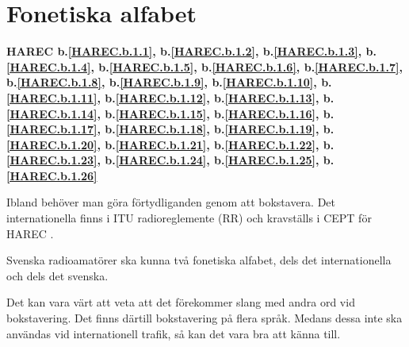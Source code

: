 \section{Fonetiska alfabet}
\textbf{
HAREC b.\ref{HAREC.b.1.1}\label{myHAREC.b.1.1},
 b.\ref{HAREC.b.1.2}\label{myHAREC.b.1.2},
 b.\ref{HAREC.b.1.3}\label{myHAREC.b.1.3},
 b.\ref{HAREC.b.1.4}\label{myHAREC.b.1.4},
 b.\ref{HAREC.b.1.5}\label{myHAREC.b.1.5},
 b.\ref{HAREC.b.1.6}\label{myHAREC.b.1.6},
 b.\ref{HAREC.b.1.7}\label{myHAREC.b.1.7},
 b.\ref{HAREC.b.1.8}\label{myHAREC.b.1.8},
 b.\ref{HAREC.b.1.9}\label{myHAREC.b.1.9},
 b.\ref{HAREC.b.1.10}\label{myHAREC.b.1.10},
 b.\ref{HAREC.b.1.11}\label{myHAREC.b.1.11},
 b.\ref{HAREC.b.1.12}\label{myHAREC.b.1.12},
 b.\ref{HAREC.b.1.13}\label{myHAREC.b.1.13},
 b.\ref{HAREC.b.1.14}\label{myHAREC.b.1.14},
 b.\ref{HAREC.b.1.15}\label{myHAREC.b.1.15},
 b.\ref{HAREC.b.1.16}\label{myHAREC.b.1.16},
 b.\ref{HAREC.b.1.17}\label{myHAREC.b.1.17},
 b.\ref{HAREC.b.1.18}\label{myHAREC.b.1.18},
 b.\ref{HAREC.b.1.19}\label{myHAREC.b.1.19},
 b.\ref{HAREC.b.1.20}\label{myHAREC.b.1.20},
 b.\ref{HAREC.b.1.21}\label{myHAREC.b.1.21},
 b.\ref{HAREC.b.1.22}\label{myHAREC.b.1.22},
 b.\ref{HAREC.b.1.23}\label{myHAREC.b.1.23},
 b.\ref{HAREC.b.1.24}\label{myHAREC.b.1.24},
 b.\ref{HAREC.b.1.25}\label{myHAREC.b.1.25},
 b.\ref{HAREC.b.1.26}\label{myHAREC.b.1.26}
}

Ibland behöver man göra förtydliganden genom att bokstavera.
Det internationella finns i ITU radioreglemente (RR) \cite[Appendix 14]{ITU-RR}
och kravställs i CEPT för HAREC \cite[Annex 6]{TR6102}.

Svenska radioamatörer ska kunna två fonetiska alfabet, dels det
internationella och dels det svenska.

Det kan vara värt att veta att det förekommer slang med andra ord vid
bokstavering. Det finns därtill bokstavering på flera språk. Medans
dessa inte ska användas vid internationell trafik, så kan det vara bra
att känna till.

